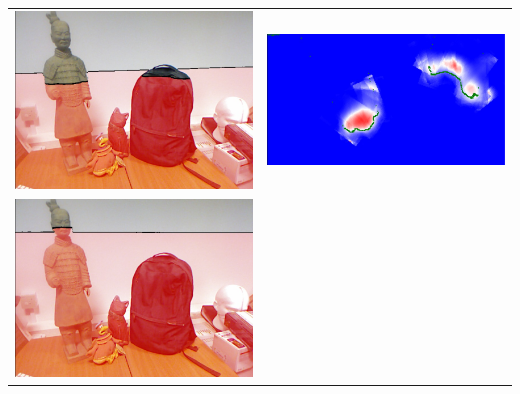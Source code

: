 \documentclass[10pt,onecolumn,letterpaper]{article}
\begin{document}
\begin{tabular}{cc}
\includegraphics[height=\imheight]{real/statue/rgb_00150.jpg} &
\includegraphics[height=\imheight]{real/statue/slice_00150.jpg} \\
\includegraphics[height=\imheight]{real/statue/rgb_00200.jpg} &

\end{tabular}
\end{document}
